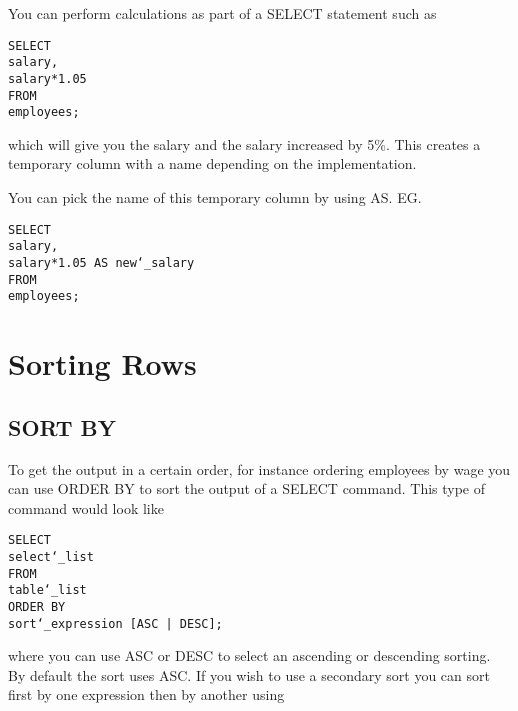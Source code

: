 \documentclass[10pt, english]{article}
\begin{document}
You can perform calculations as part of a SELECT statement such as

\texttt{SELECT\\
\hspace*{10pt}salary,\\
\hspace*{10pt}salary*1.05\\
FROM\\
\hspace*{10pt}employees;
}

which will give you the salary and the salary increased by 5\%. This creates a temporary column
with a name depending on the implementation.

You can pick the name of this temporary column by using AS. EG.

\texttt{SELECT\\
\hspace*{10pt}salary,\\
\hspace*{10pt}salary*1.05 AS new\char`_salary\\
FROM\\
\hspace*{10pt}employees;
}

\newpage
\section{Sorting Rows}
\subsection{SORT BY}
To get the output in a certain order, for instance ordering employees by wage you can use 
ORDER BY to sort the output of a SELECT command. This type of command would look like

\texttt{SELECT\\
\hspace*{10pt}select\char`_list \\
FROM\\
\hspace*{10pt}table\char`_list \\
ORDER BY\\
\hspace*{10pt}sort\char`_expression [ASC | DESC];
}

where you can use ASC or DESC to select an ascending or descending sorting. By default
the sort uses ASC. If you wish to use a secondary sort you can sort first by
one expression then by another using 
\end{document}
